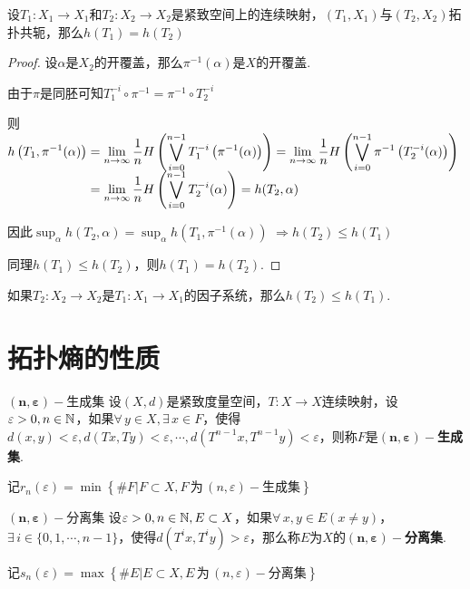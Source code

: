 \begin{theorem}{}
    设$T_1:X_1\to X_1$和$T_2:X_2\to X_2$是紧致空间上的连续映射，$(T_1,X_1)$与$(T_2,X_2)$拓扑共轭，那么$h(T_1)=h(T_2)$
\end{theorem}
\begin{proof}
    设$\alpha$是$X_2$的开覆盖，那么$\pi^{-1}(\alpha)$是$X$的开覆盖.\par
    由于$\pi$是同胚可知$T_1^{-i}\circ\pi^{-1}=\pi^{-1}\circ T_2^{-i}$\par
    则$\setjot[-2]\begin{aligned}[t]
        h \left(T_1,\pi^{-1}(\alpha)\right) &=\lim_{n\to\infty}{\frac{1}{n}H\left(\bigvee_{i=0}^{n-1}T_1^{-i}\left(\pi^{-1}(\alpha)\right)\right)}=\lim_{n\to\infty}{\frac{1}{n}H\left(\bigvee_{i=0}^{n-1}\pi^{-1}\left(T_2^{-i}(\alpha)\right)\right)} \\
        &= \lim_{n\to\infty}{\frac{1}{n}H\left(\bigvee_{i=0}^{n-1}T_2^{-i}(\alpha)\right)}=h(T_2,\alpha)
    \end{aligned}$\par
    因此$\sup_{\alpha}{h(T_2,\alpha)}=\sup_{\alpha}{h \left(T_1,\pi^{-1}(\alpha)\right)}$
    $\Rightarrow h(T_2)\leq h(T_1)$\par
    同理$h(T_1)\leq h(T_2)$，则$h(T_1)=h(T_2)$.
\end{proof}

\begin{corollary}{}
    如果$T_2:X_2\to X_2$是$T_1:X_1\to X_1$的因子系统，那么$h(T_2)\leq h(T_1)$.
\end{corollary}

\section{拓扑熵的性质}

\begin{definition}{$\bm{(n,\varepsilon)-}$生成集}
    设$(X,d)$是紧致度量空间，$T:X\to X$连续映射，设$\varepsilon>0,n\in\mathbb{N}$，如果$\forall\, y\in X,\exists\, x\in F$，使得$d(x,y)<\varepsilon,d(Tx,Ty)<\varepsilon,\cdots,d \left(T^{n-1}x,T^{n-1}y\right)<\varepsilon$，则称$F$是\textbf{$\bm{(n,\varepsilon)-}$生成集}.\par
    记$r_n(\varepsilon)=\min\left\{\#F|F\subset X,F\,\text{为}\,(n,\varepsilon)-\text{生成集}\right\}$
\end{definition}

\begin{definition}{$\bm{(n,\varepsilon)-}$分离集}
    设$\varepsilon>0,n\in\mathbb{N},E\subset X$，如果$\forall\, x,y\in E(x\neq y)$，$\exists\, i\in\{0,1,\cdots,n-1\}$，使得$d \left(T^ix,T^iy\right)>\varepsilon$，那么称$E$为$X$的\textbf{$\bm{(n,\varepsilon)-}$分离集}.\par
    记$s_n(\varepsilon)=\max\left\{\#E|E\subset X,E\,\text{为}\,(n,\varepsilon)-\text{分离集}\right\}$
\end{definition}

